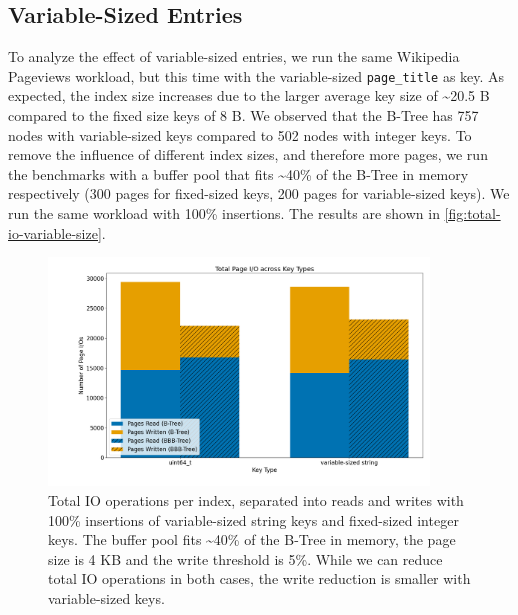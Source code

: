 

\subsection*{Variable-Sized Entries}
To analyze the effect of variable-sized entries, we run the same Wikipedia Pageviews workload, but this time with the variable-sized \texttt{page\_title} as key.
As expected, the index size increases due to the larger average key size of \textasciitilde 20.5 B compared to the fixed size keys of 8 B.
We observed that the B-Tree has 757 nodes with variable-sized keys compared to 502 nodes with integer keys.
To remove the influence of different index sizes, and therefore more pages, we run the benchmarks with a buffer pool that fits \textasciitilde40\% of the B-Tree in memory respectively (300 pages for fixed-sized keys, 200 pages for variable-sized keys).
We run the same workload with 100\% insertions.
The results are shown in \autoref{fig:total-io-variable-size}.

\begin{figure}[htbp]
  \centering
  \includegraphics[width=0.9\textwidth]{figures/evaluation/pageviews_total_io_variable_size.png}
  \caption{Total \ac{IO} operations per index, separated into reads and writes with 100\% insertions of variable-sized string keys and fixed-sized integer keys. The buffer pool fits \textasciitilde40\% of the B-Tree in memory, the page size is 4 KB and the write threshold is 5\%. While we can reduce total \ac{IO} operations in both cases, the write reduction is smaller with variable-sized keys.}
  \label{fig:total-io-variable-size}
\end{figure}

